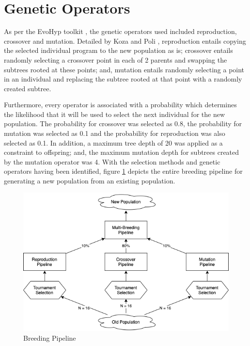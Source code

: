\section{Genetic Operators}\label{sec:genetic_operators}
As per the EvoHyp toolkit \cite{pillay2017evohyp}, the genetic operators used included reproduction, crossover and mutation. Detailed by Koza and Poli \cite{koza2005genetic}, reproduction entails copying the selected individual program to the new population as is; crossover entails randomly selecting a crossover point in each of 2 parents and swapping the subtrees rooted at these points; and, mutation entails randomly selecting a point in an individual and replacing the subtree rooted at that point with a randomly created subtree.

Furthermore, every operator is associated with a probability which determines the likelihood that it will be used to select the next individual for the new population. The probability for crossover was selected as 0.8, the probability for mutation was selected as 0.1 and the probability for reproduction was also selected as 0.1. In addition, a maximum tree depth of 20 was applied as a constraint to offspring; and, the maximum mutation depth for subtrees created by the mutation operator was 4. With the selection methods and genetic operators having been identified, figure \ref{fig:breeding_pipeline} depicts the entire breeding pipeline for generating a new population from an existing population.

\begin{figure}[H]
\centering
\includegraphics[width=\textwidth]{report/05_genetic_operators/breeding_pipeline.png}
\caption{Breeding Pipeline}
\label{fig:breeding_pipeline}
\end{figure}